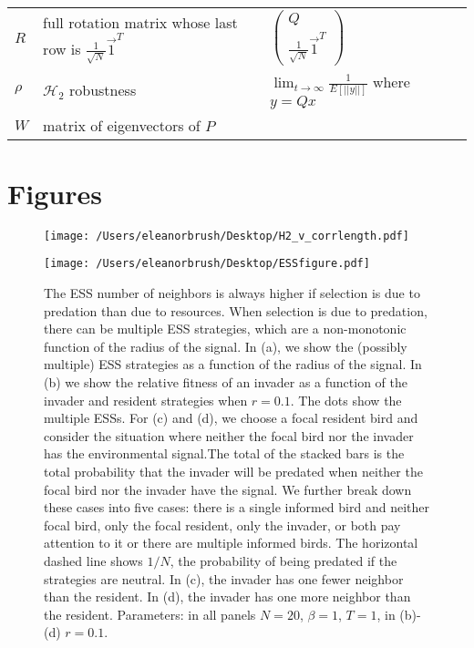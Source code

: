 \documentclass{article}
\begin{document}
\begin{table}
\begin{tabular}{@{}lllll@{}}
\\$R$ & full rotation matrix whose last row is $\frac{1}{\sqrt{N}}\vec{1}^T$ & $\left(\begin{array}{cc} Q \\ \frac{1}{\sqrt{N}}\vec{1}^T \end{array}\right)$
\\$\rho$ & $\mathscr{H}_2$ robustness & $\lim_{t\to\infty}\frac{1}{E[||y||]}$ where $y=Qx$
\\$W$ & matrix of eigenvectors of $P$
\end{tabular}
\end{table}

\newpage
\section{Figures }
\begin{figure}
\texttt{[image: /Users/eleanorbrush/Desktop/H2\_v\_corrlength.pdf]}
\caption{\label{compare_props} }
\end{figure}

\begin{figure}
\texttt{[image: /Users/eleanorbrush/Desktop/ESSfigure.pdf]}
\caption{\label{ESS} The ESS number of neighbors is always higher if selection is due to predation than due to resources. When selection is due to predation, there can be multiple ESS strategies, which are a non-monotonic function of the radius of the signal. In (a), we show the (possibly multiple) ESS strategies as a function of the radius of the signal. In (b) we show the relative fitness of an invader as a function of the invader and resident strategies when $r=0.1$. The dots show the multiple ESSs. For (c) and (d), we choose a focal resident bird and consider the situation where neither the focal bird nor the invader has the environmental signal.The total of the stacked bars is the total probability that the invader will be predated when neither the focal bird nor the invader have the signal.  We further break down these cases into five cases: there is a single informed bird and neither focal bird, only the focal resident, only the invader, or both pay attention to it or there are multiple informed birds. The horizontal dashed line shows $1/N$, the probability of being predated if the strategies are neutral. In (c), the invader has one fewer neighbor than the resident. In (d), the invader has one more neighbor than the resident. Parameters:  in all panels $N=20$, $\beta=1$, $T=1$, in (b)-(d) $r=0.1$. 
}
\end{figure}
\end{document}
